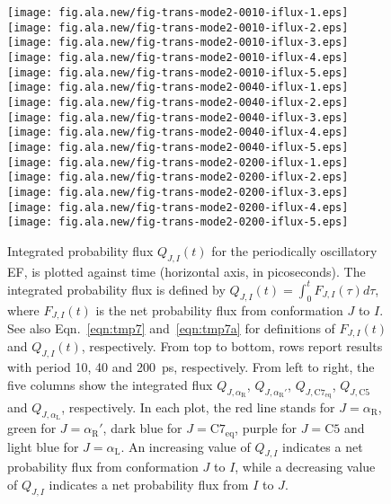 \documentclass[a4paper,preprint,unsortedaddress,onecolumn]{revtex4-1}
\newcommand{\confaa}[0]{{\alpha_{\textrm{R}}}}
\newcommand{\confab}[0]{{\alpha_{\textrm{R}}'}}
\newcommand{\confba}[0]{{\textrm{C}7_{\textrm{eq}}}}
\newcommand{\confbb}[0]{{\textrm{C}5}}
\newcommand{\confc}[0]{{\alpha_{\textrm{L}}}}
\begin{document}
\begin{figure}
  \centering
  \texttt{[image: fig.ala.new/fig-trans-mode2-0010-iflux-1.eps]}
  \texttt{[image: fig.ala.new/fig-trans-mode2-0010-iflux-2.eps]}
  \texttt{[image: fig.ala.new/fig-trans-mode2-0010-iflux-3.eps]}
  \texttt{[image: fig.ala.new/fig-trans-mode2-0010-iflux-4.eps]}
  \texttt{[image: fig.ala.new/fig-trans-mode2-0010-iflux-5.eps]}\\
  \texttt{[image: fig.ala.new/fig-trans-mode2-0040-iflux-1.eps]}
  \texttt{[image: fig.ala.new/fig-trans-mode2-0040-iflux-2.eps]}
  \texttt{[image: fig.ala.new/fig-trans-mode2-0040-iflux-3.eps]}
  \texttt{[image: fig.ala.new/fig-trans-mode2-0040-iflux-4.eps]}
  \texttt{[image: fig.ala.new/fig-trans-mode2-0040-iflux-5.eps]}\\
  \texttt{[image: fig.ala.new/fig-trans-mode2-0200-iflux-1.eps]}
  \texttt{[image: fig.ala.new/fig-trans-mode2-0200-iflux-2.eps]}
  \texttt{[image: fig.ala.new/fig-trans-mode2-0200-iflux-3.eps]}
  \texttt{[image: fig.ala.new/fig-trans-mode2-0200-iflux-4.eps]}
  \texttt{[image: fig.ala.new/fig-trans-mode2-0200-iflux-5.eps]}\\
  \caption{
    Integrated probability flux $Q_{J,I}(t)$ for the periodically
    oscillatory EF, is plotted against time (horizontal axis, in picoseconds).
    The integrated
    probability flux is defined by $Q_{J,I}(t) = \int_0^t F_{J,I}(\tau) d\tau$, where
    $F_{J,I}(t)$ is the net probability flux from conformation $J$ to $I$.
    See also Eqn.~\eqref{eqn:tmp7} and~\eqref{eqn:tmp7a} for definitions
    of $F_{J,I}(t)$ and $Q_{J,I}(t)$, respectively.
    From top to bottom, rows report results with  period 10, 40 and 200~ps, respectively.
    From left to right, the five
    columns show the integrated flux $Q_{J,\confaa}$, $Q_{J,\confab}$,
    $Q_{J,\confba}$, $Q_{J,\confbb}$ and $Q_{J,\confc}$, respectively. In each plot,
    the red line stands for $J=\confaa$, green for $J=\confab$, dark blue for $J=\confba$,
    purple for $J=\confbb$ and light blue for $J=\confc$.
    An increasing value of $Q_{J,I}$ indicates a net probability
      flux from conformation $J$ to $I$,
      while a decreasing value of $Q_{J,I}$ indicates a net probability
      flux from $I$ to $J$.
  }
  \label{fig:tmp10}
\end{figure}
\end{document}
